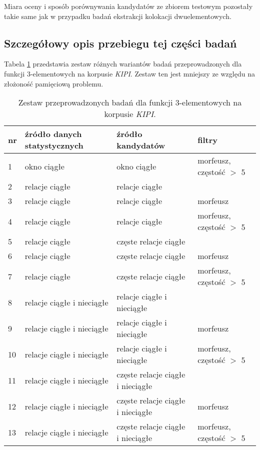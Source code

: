 \par
Miara oceny i sposób porównywania kandydatów ze zbiorem testowym pozostały takie same jak w przypadku badań ekstrakcji kolokacji dwuelementowych.


\subsection{Szczegółowy opis przebiegu tej części badań}
Tabela \ref{KIPI_3_research_types} przedstawia zestaw różnych wariantów badań przeprowadzonych dla funkcji 3-elementowych na korpusie \emph{KIPI}.
Zestaw ten jest mniejszy ze względu na złożoność pamięciową problemu.

\begin{table}[h!]
\centering
\footnotesize\setlength{\tabcolsep}{2.5pt}
\begin{tabular}{ l || l | l | l }
	\toprule
	\textbf{nr} 	& \textbf{źródło danych statystycznych}	& \textbf{źródło kandydatów}			& \textbf{filtry}					\\
	\midrule
	1	& okno ciągłe 			& okno ciągłe				& morfeusz, częstość $>$ 5	\\
	2	& relacje ciągłe		& relacje ciągłe			&				\\
	3	& relacje ciągłe		& relacje ciągłe			& morfeusz					\\
	4	& relacje ciągłe		& relacje ciągłe			& morfeusz, częstość $>$ 5	\\
	5	& relacje ciągłe		& częste relacje ciągłe 		&							\\
	6	& relacje ciągłe		& częste relacje ciągłe 		& morfeusz					\\
	7	& relacje ciągłe		& częste relacje ciągłe 		& morfeusz, częstość $>$ 5	\\
	8	& relacje ciągłe i nieciągłe	& relacje ciągłe i nieciągłe 		& 							\\
	9	& relacje ciągłe i nieciągłe	& relacje ciągłe i nieciągłe		& morfeusz					\\
	10	& relacje ciągłe i nieciągłe	& relacje ciągłe i nieciągłe		& morfeusz, częstość $>$ 5	\\
	11	& relacje ciągłe i nieciągłe	& częste relacje ciągłe i nieciągłe	& 							\\
	12	& relacje ciągłe i nieciągłe	& częste relacje ciągłe i nieciągłe	& morfeusz					\\
	13	& relacje ciągłe i nieciągłe	& częste relacje ciągłe i nieciągłe	& morfeusz, częstość $>$ 5	\\
	\bottomrule
\end{tabular}
\caption[Zestaw przeprowadzonych badań dla funkcji 3-elementowych na korpusie \emph{KIPI}]{Zestaw przeprowadzonych badań dla funkcji 3-elementowych na korpusie \emph{KIPI}.}
\label{KIPI_3_research_types}
\end{table}

